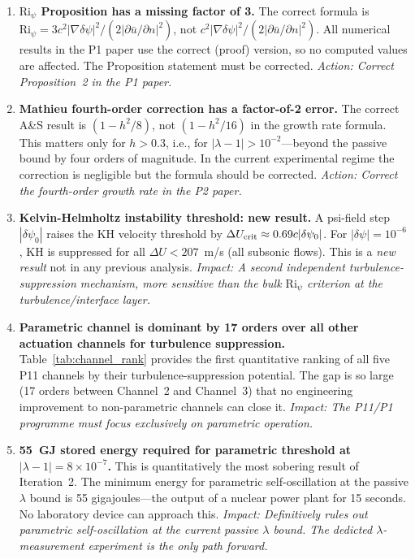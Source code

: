 \documentclass[11pt,twocolumn]{article}
\newcommand{\dpsi}{\delta\psi}
\newcommand{\lam}{\lambda}
\newcommand{\Ri}{\mathrm{Ri}}
\begin{document}
\begin{enumerate}

\item \textbf{$\Ri_\psi$ Proposition has a missing factor of 3.}
The correct formula is $\Ri_\psi = 3c^2|\nabla\dpsi|^2/(2|\partial\bar{u}/\partial n|^2)$,
not $c^2|\nabla\dpsi|^2/(2|\partial\bar{u}/\partial n|^2)$.
All numerical results in the P1 paper use the correct (proof) version,
so no computed values are affected. The Proposition statement must be corrected.
\emph{Action: Correct Proposition~2 in the P1 paper.}

\item \textbf{Mathieu fourth-order correction has a factor-of-2 error.}
The correct A\&S result is $(1 - h^2/8)$, not $(1 - h^2/16)$ in the
growth rate formula. This matters only for $h > 0.3$, i.e., for
$|\lam-1| > 10^{-2}$---beyond the passive bound by four orders of magnitude.
In the current experimental regime the correction is negligible but the
formula should be corrected.
\emph{Action: Correct the fourth-order growth rate in the P2 paper.}

\item \textbf{Kelvin-Helmholtz instability threshold: new result.}
A psi-field step $|\dpsi_0|$ raises the KH velocity threshold by
$\Delta U_{\rm crit} \approx 0.69c|\dpsi_0|$. For $|\dpsi| = 10^{-6}$,
KH is suppressed for all $\Delta U < 207$~m/s (all subsonic flows).
This is a \emph{new result} not in any previous analysis.
\emph{Impact: A second independent turbulence-suppression mechanism, more
sensitive than the bulk $\Ri_\psi$ criterion at the turbulence/interface layer.}

\item \textbf{Parametric channel is dominant by 17 orders over all other
actuation channels for turbulence suppression.}
Table~\ref{tab:channel_rank} provides the first quantitative ranking of
all five P11 channels by their turbulence-suppression potential.
The gap is so large (17 orders between Channel~2 and Channel~3) that
no engineering improvement to non-parametric channels can close it.
\emph{Impact: The P11/P1 programme must focus exclusively on parametric operation.}

\item \textbf{55~GJ stored energy required for parametric threshold at
$|\lam-1| = 8\times10^{-7}$.}
This is quantitatively the most sobering result of Iteration~2.
The minimum energy for parametric self-oscillation at the passive $\lam$
bound is 55 gigajoules---the output of a nuclear power plant for 15 seconds.
No laboratory device can approach this.
\emph{Impact: Definitively rules out parametric self-oscillation at the current
passive $\lam$ bound. The dedicted $\lam$-measurement experiment is the only
path forward.}


\end{enumerate}
\end{document}
